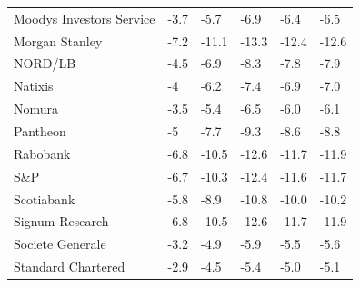 \begin{table}[H]
{\begin{tabular}{l|l|llll}
Moodys Investors Service         & -3.7                        & -5.7                          & -6.9                         & -6.4                          & -6.5                            \\
Morgan Stanley                   & -7.2                        & -11.1                         & -13.3                        & -12.4                         & -12.6                           \\
NORD/LB                          & -4.5                        & -6.9                          & -8.3                         & -7.8                          & -7.9                            \\
Natixis                          & -4                          & -6.2                          & -7.4                         & -6.9                          & -7.0                            \\
Nomura                           & -3.5                        & -5.4                          & -6.5                         & -6.0                          & -6.1                            \\
Pantheon                         & -5                          & -7.7                          & -9.3                         & -8.6                          & -8.8                            \\
Rabobank                         & -6.8                        & -10.5                         & -12.6                        & -11.7                         & -11.9                           \\
S\&P                             & -6.7                        & -10.3                         & -12.4                        & -11.6                         & -11.7                           \\
Scotiabank                       & -5.8                        & -8.9                          & -10.8                        & -10.0                         & -10.2                           \\
Signum Research                  & -6.8                        & -10.5                         & -12.6                        & -11.7                         & -11.9                           \\
Societe Generale                 & -3.2                        & -4.9                          & -5.9                         & -5.5                          & -5.6                            \\
Standard Chartered               & -2.9                        & -4.5                          & -5.4                         & -5.0                          & -5.1                            \\

\end{tabular}}
\end{table}
